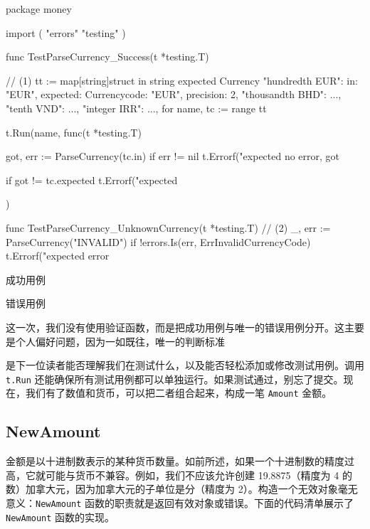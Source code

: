 \begin{gocode}[title={代码清单 6.14 \texttt{currency\_internal\_test.go}：\texttt{TestParseCurrency} 函数},listing options={basicstyle=\ttfamily\footnotesize\color{PocketInk}}]
package money

import (
    "errors"
    "testing"
)


func TestParseCurrency_Success(t *testing.T) { // (1)
    tt := map[string]struct {
        in       string
        expected Currency
    }{
        "hundredth EUR": {
            in: "EUR",
            expected: Currency{code: "EUR", precision: 2}},
        "thousandth BHD": {...},
        "tenth VND": {...},
        "integer IRR": {...},
    }
    for name, tc := range tt {
        t.Run(name, func(t *testing.T) {
            got, err := ParseCurrency(tc.in)
            if err != nil {
                t.Errorf("expected no error, got %
            }

             if got != tc.expected {
                 t.Errorf("expected %
             }
        })
    }
}


func TestParseCurrency_UnknownCurrency(t *testing.T) { // (2)
    _, err := ParseCurrency("INVALID")
    if !errors.Is(err, ErrInvalidCurrencyCode) {
        t.Errorf("expected error %
    }
}
\end{gocode}

\begin{codeannotations}
\item 成功用例
\item 错误用例
\end{codeannotations}

这一次，我们没有使用验证函数，而是把成功用例与唯一的错误用例分开。这主要是个人偏好问题，因为一如既往，唯一的判断标准

是下一位读者能否理解我们在测试什么，以及能否轻松添加或修改测试用例。调用 \texttt{t.Run} 还能确保所有测试用例都可以单独运行。如果测试通过，别忘了提交。现在，我们有了数值和货币，可以把二者组合起来，构成一笔 \texttt{Amount} 金额。

\subsection{NewAmount}

金额是以十进制数表示的某种货币数量。如前所述，如果一个十进制数的精度过高，它就可能与货币不兼容。例如，我们不应该允许创建 19.8875（精度为 4 的数）加拿大元，因为加拿大元的子单位是分（精度为 2）。构造一个无效对象毫无意义：\texttt{NewAmount} 函数的职责就是返回有效对象或错误。下面的代码清单展示了 \texttt{NewAmount} 函数的实现。

